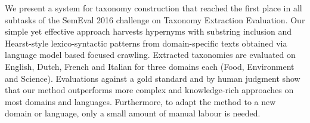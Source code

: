 We present a system for taxonomy construction that reached the first place in all subtasks of the SemEval 2016 challenge on Taxonomy Extraction Evaluation. Our simple yet effective approach harvests hypernyms with substring inclusion and Hearst-style lexico-syntactic patterns from domain-specific texts obtained via language model based focused crawling. Extracted taxonomies are evaluated on English, Dutch, French and Italian for three domains each  (Food, Environment and Science). Evaluations against a gold standard and by human judgment show that our method outperforms more complex and knowledge-rich approaches on most domains and languages. Furthermore, to adapt the method to a new domain or language, only a small amount of manual labour is needed.
